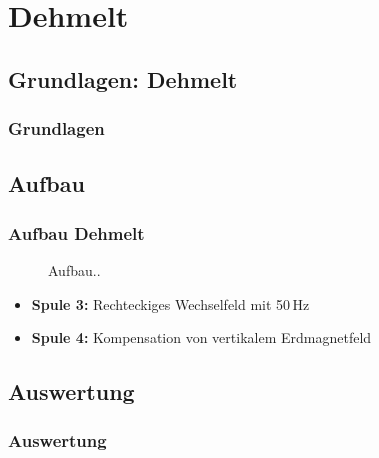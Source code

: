 
\section{Dehmelt}
\subsection{Grundlagen: Dehmelt}
\begin{frame}
\frametitle{Grundlagen}
  
\end{frame}

\subsection{Aufbau}
\begin{frame}
\frametitle{Aufbau Dehmelt}

\begin{figure}
    \centering
    \def\svgwidth{\textwidth}
    
    \caption{Aufbau..}
\end{figure}

\begin{itemize}
  \item \textbf{Spule 3:} Rechteckiges Wechselfeld mit 50\,Hz
  \item \textbf{Spule 4:} Kompensation von vertikalem Erdmagnetfeld
\end{itemize}

\end{frame}

\subsection{Auswertung}
\begin{frame}
\frametitle{Auswertung}
  
\end{frame}